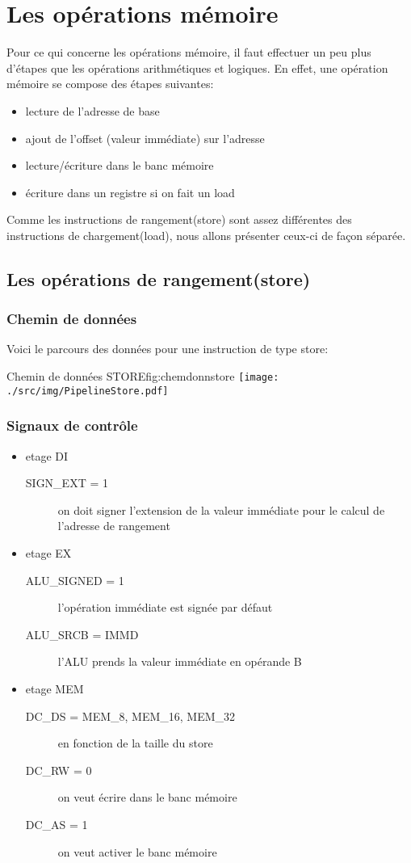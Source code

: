 \section{Les opérations mémoire}

Pour ce qui concerne les opérations mémoire, il faut effectuer un peu plus d'étapes que les opérations arithmétiques et logiques.
En effet, une opération mémoire se compose des étapes suivantes:
\begin{itemize}
\item lecture de l'adresse de base
\item ajout de l’offset (valeur immédiate) sur l'adresse
\item lecture/écriture dans le banc mémoire
\item écriture dans un registre si on fait un load
\end{itemize}

Comme les instructions de rangement(store) sont assez différentes des instructions de chargement(load), nous allons présenter ceux-ci de façon séparée.

\subsection{Les opérations de rangement(store)}
\subsubsection{Chemin de données}
Voici le parcours des données pour une instruction de type store:
\begin{figureGraphics}{Chemin de données STORE}{fig:chemdonnstore}
  \centering
  \texttt{[image: ./src/img/PipelineStore.pdf]}
\end{figureGraphics}
\subsubsection{Signaux de contrôle}
\begin{itemize}
  \item etage DI
    \begin{description}
      \item[SIGN\_EXT = 1] on doit signer l'extension de la valeur immédiate pour le calcul de l’adresse de rangement
    \end{description}
  \item etage EX
    \begin{description}
      \item[ALU\_SIGNED = 1] l'opération immédiate est signée par défaut
      \item[ALU\_SRCB = IMMD] l'ALU prends la valeur immédiate en opérande B
    \end{description}
  \item etage MEM
    \begin{description}
      \item[DC\_DS = MEM\_8, MEM\_16, MEM\_32] en fonction de la taille du store
      \item[DC\_RW = 0] on veut écrire dans le banc mémoire
      \item[DC\_AS = 1] on veut activer le banc mémoire
    \end{description}
\end{itemize}
